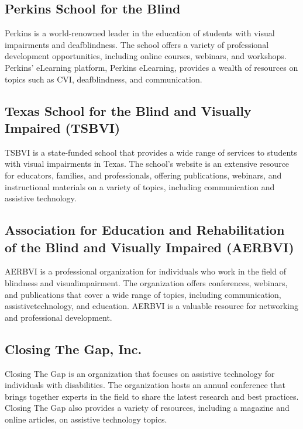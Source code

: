 \subsection{Perkins School for the Blind}\label{app6:perkins}
Perkins is a world-renowned leader in the education of students with visual impairments and deafblindness. The school offers a variety of professional development opportunities, including online courses, webinars, and workshops. Perkins' eLearning platform, Perkins eLearning, provides a wealth of resources on topics such as CVI, deafblindness, and communication.

\subsection{Texas School for the Blind and Visually Impaired (TSBVI)}\label{app6:tsbvi}
TSBVI is a state-funded school that provides a wide range of services to students with visual impairments in Texas. The school's website is an extensive resource for educators, families, and professionals, offering publications, webinars, and instructional materials on a variety of topics, including communication and assistive technology.

\subsection{Association for Education and Rehabilitation of the Blind and Visually Impaired (AERBVI)}\label{app6:aerbvi}
AERBVI is a professional organization for individuals who work in the field of blindness and \gls{visualimpairment}. The organization offers conferences, webinars, and publications that cover a wide range of topics, including communication, \gls{assistivetechnology}, and education. AERBVI is a valuable resource for networking and professional development.

\subsection{Closing The Gap, Inc.}\label{app6:ctg}
Closing The Gap is an organization that focuses on assistive \gls{technology} for individuals with disabilities. The organization hosts an annual conference that brings together experts in the field to share the latest research and best practices. Closing The Gap also provides a variety of resources, including a magazine and online articles, on assistive \gls{technology} topics.

